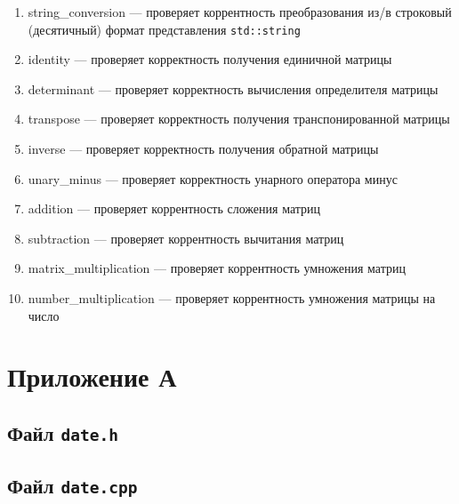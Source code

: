 \documentclass[a4paper,12pt]{article}
\begin{document}
\begin{enumerate}
	
\item string\_conversion — проверяет коррентность преобразования из/в строковый (десятичный) формат представления \verb!std::string!
	
\item identity — проверяет корректность получения единичной матрицы

\item determinant — проверяет корректность вычисления определителя матрицы

\item transpose — проверяет корректность получения транспонированной матрицы

\item inverse — проверяет корректность получения обратной матрицы

\item unary\_minus — проверяет корректность унарного оператора минус

\item addition — проверяет коррентность сложения матриц

\item subtraction — проверяет коррентность вычитания матриц

\item matrix\_multiplication — проверяет коррентность умножения матриц

\item number\_multiplication — проверяет коррентность умножения матрицы на число
	
\end{enumerate}

\cleardoublepage

\section*{Приложение А}

\subsection*{Файл {\tt date.h}}\label{att1}


\cleardoublepage

\subsection*{Файл {\tt date.cpp}}\label{att6}
\end{document}
